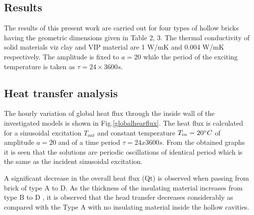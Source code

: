 \documentclass{article}
\begin{document}
\begin{multicols}{2}
\section{Results}
The results of this present work are carried out for four types of hollow bricks having the geometric dimensions given in Table 2, 3. The thermal conductivity of solid materials viz clay and VIP material are 1 W/mK and 0.004 W/mK respectively. The amplitude is fixed to $a = 20$ while the  period of the exciting temperature is taken as $\tau= 24 \times 3600 s$.

\subsection{Heat transfer analysis}
The hourly variation of global heat flux through the inside wall of the investigated models is shown in Fig.\ref{globalhearflux}. The heat flux is calculated for a sinusoidal excitation $T_{out}$ and  constant temperature $T_{in} = 20 \degree C $  of amplitude $a = 20$ and of a time period $\tau = 24x3600 s$. From the obtained graphs it is seen that the solutions are periodic oscillations of identical period which is the same as the incident sinusoidal excitation. 

A significant decrease in the overall heat flux (Qt) is observed when passing from brick of type A to D. As the thickness of the insulating material increases from type B to D , it is observed that the head transfer decreases considerably as compared with the Type A with no insulating material inside the hollow cavities.
\end{multicols}
\end{document}
